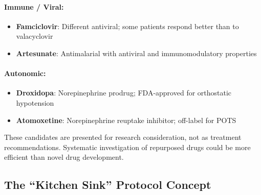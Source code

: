 \begin{open_question}
\paragraph{Immune / Viral:}
\begin{itemize}
    \item \textbf{Famciclovir}: Different antiviral; some patients respond better than to valacyclovir
    \item \textbf{Artesunate}: Antimalarial with antiviral and immunomodulatory properties
\end{itemize}

\paragraph{Autonomic:}
\begin{itemize}
    \item \textbf{Droxidopa}: Norepinephrine prodrug; FDA-approved for orthostatic hypotension
    \item \textbf{Atomoxetine}: Norepinephrine reuptake inhibitor; off-label for POTS
\end{itemize}

These candidates are presented for research consideration, not as treatment recommendations. Systematic investigation of repurposed drugs could be more efficient than novel drug development.
\end{open_question}

\subsection{The ``Kitchen Sink'' Protocol Concept}
\label{sec:kitchen-sink}

